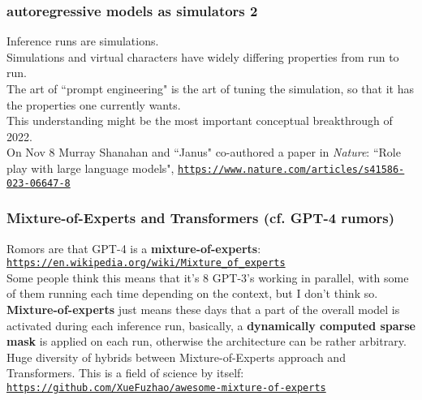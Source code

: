\documentclass{beamer}
\newcommand{\msblue}[1]{{\color{myblue} #1}}
\begin{document}
\begin{frame}

  \frametitle{autoregressive models as simulators 2}

Inference runs are simulations.\\[2ex]

Simulations and virtual characters have widely differing properties from run to run.\\[2ex]

The art of ``prompt engineering" is the art of tuning the simulation, so that it has
the properties one currently wants.\\[2ex]

This understanding might be the most important conceptual breakthrough of 2022.\\[2ex]

On Nov 8 Murray Shanahan and ``Janus" co-authored a paper in {\em Nature}:
``Role play with large language models",
\msblue{\href{https://www.nature.com/articles/s41586-023-06647-8}{\tt\small https://www.nature.com/articles/s41586-023-06647-8}}

\end{frame}

\begin{frame}

  \frametitle{Mixture-of-Experts and Transformers (cf. GPT-4 rumors)}

Romors are that GPT-4 is a {\bf mixture-of-experts}: \href{https://en.wikipedia.org/wiki/Mixture\_of\_experts}{\tt\small https://en.wikipedia.org/wiki/Mixture\_of\_experts}\\[2ex]

Some people think this means that it's 8 GPT-3's working in parallel, with some of them
running each time depending on the context, but I don't think so.\\[2ex]

{\bf Mixture-of-experts} just means these days that a part of the overall model
is activated during each inference run, basically, a {\bf dynamically computed sparse mask} 
is applied on each run, otherwise the architecture can be rather arbitrary.\\[2ex]

Huge diversity of hybrids between Mixture-of-Experts approach and Transformers.
This is a field of science by itself:
\msblue{\href{https://github.com/XueFuzhao/awesome-mixture-of-experts}{\tt\small https://github.com/XueFuzhao/awesome-mixture-of-experts}}

\end{frame}
\end{document}
